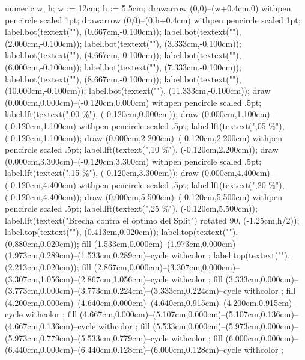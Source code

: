 {\startMPcode
numeric w, h; w := 12cm; h := 5.5cm;
drawarrow (0,0)--(w+0.4cm,0) withpen pencircle scaled 1pt;
drawarrow (0,0)--(0,h+0.4cm) withpen pencircle scaled 1pt;
label.bot(textext(""), (0.667cm,-0.100cm));
label.bot(textext(""), (2.000cm,-0.100cm));
label.bot(textext(""), (3.333cm,-0.100cm));
label.bot(textext(""), (4.667cm,-0.100cm));
label.bot(textext(""), (6.000cm,-0.100cm));
label.bot(textext(""), (7.333cm,-0.100cm));
label.bot(textext(""), (8.667cm,-0.100cm));
label.bot(textext(""), (10.000cm,-0.100cm));
label.bot(textext(""), (11.333cm,-0.100cm));
draw (0.000cm,0.000cm)--(-0.120cm,0.000cm) withpen pencircle scaled .5pt;
label.lft(textext(",00 \%"), (-0.120cm,0.000cm));
draw (0.000cm,1.100cm)--(-0.120cm,1.100cm) withpen pencircle scaled .5pt;
label.lft(textext(",05 \%"), (-0.120cm,1.100cm));
draw (0.000cm,2.200cm)--(-0.120cm,2.200cm) withpen pencircle scaled .5pt;
label.lft(textext(",10 \%"), (-0.120cm,2.200cm));
draw (0.000cm,3.300cm)--(-0.120cm,3.300cm) withpen pencircle scaled .5pt;
label.lft(textext(",15 \%"), (-0.120cm,3.300cm));
draw (0.000cm,4.400cm)--(-0.120cm,4.400cm) withpen pencircle scaled .5pt;
label.lft(textext(",20 \%"), (-0.120cm,4.400cm));
draw (0.000cm,5.500cm)--(-0.120cm,5.500cm) withpen pencircle scaled .5pt;
label.lft(textext(",25 \%"), (-0.120cm,5.500cm));
label.lft(textext("Brecha contra el óptimo del Split") rotated 90, (-1.25cm,h/2));
label.top(textext(""), (0.413cm,0.020cm));
label.top(textext(""), (0.880cm,0.020cm));
fill (1.533cm,0.000cm)--(1.973cm,0.000cm)--(1.973cm,0.289cm)--(1.533cm,0.289cm)--cycle withcolor ;
label.top(textext(""), (2.213cm,0.020cm));
fill (2.867cm,0.000cm)--(3.307cm,0.000cm)--(3.307cm,1.056cm)--(2.867cm,1.056cm)--cycle withcolor ;
fill (3.333cm,0.000cm)--(3.773cm,0.000cm)--(3.773cm,0.224cm)--(3.333cm,0.224cm)--cycle withcolor ;
fill (4.200cm,0.000cm)--(4.640cm,0.000cm)--(4.640cm,0.915cm)--(4.200cm,0.915cm)--cycle withcolor ;
fill (4.667cm,0.000cm)--(5.107cm,0.000cm)--(5.107cm,0.136cm)--(4.667cm,0.136cm)--cycle withcolor ;
fill (5.533cm,0.000cm)--(5.973cm,0.000cm)--(5.973cm,0.779cm)--(5.533cm,0.779cm)--cycle withcolor ;
fill (6.000cm,0.000cm)--(6.440cm,0.000cm)--(6.440cm,0.128cm)--(6.000cm,0.128cm)--cycle withcolor ;
}
